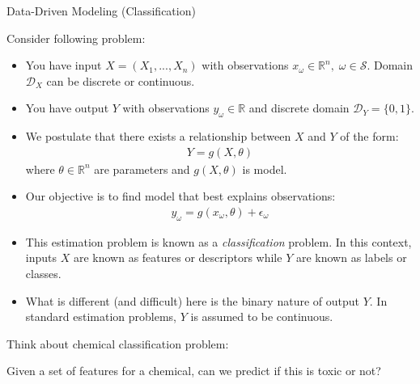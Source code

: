 \documentclass[handout,9pt]{beamer}
\begin{document}

\begin{frame}{Data-Driven Modeling (Classification)}


Consider following problem:
\begin{itemize}
\item You have input $X=(X_1,...,X_n)$ with observations $x_\omega\in \mathbb{R}^n,\; \omega \in \mathcal{S}$. Domain $\mathcal{D}_X$ can be discrete or continuous.
\item You have output $Y$ with observations $y_{\omega}\in \mathbb{R}$ and discrete domain $\mathcal{D}_Y=\{0,1\}$. 
 
\item We postulate that there exists a relationship between $X$ and $Y$ of the form:
\begin{align*}
Y=g(X,\theta)
\end{align*}
where $\theta \in \mathbb{R}^n$ are parameters and $g(X,\theta)$ is model.  

\item Our objective is to find model that best explains observations:
\begin{align*}
y_\omega=g(x_\omega,\theta)+\epsilon_\omega
\end{align*}
\item This estimation problem is known as a {\em classification} problem.  In this context, inputs $X$ are known as features or descriptors while $Y$ are known as labels or classes.  
\item What is different (and difficult) here is the binary nature of output $Y$. In standard estimation problems, $Y$ is assumed to be continuous. 

\end{itemize}

Think about chemical classification problem: 
\begin{block}{}
Given a set of features for a chemical, can we predict if this is toxic or not? 
\end{block}


\end{frame}


\end{document}
